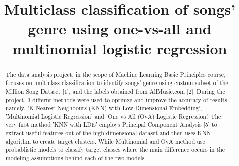 \documentclass[journal]{IEEEtran}
\begin{document}
%
\title{Multiclass classification of songs' genre using one-vs-all and multinomial logistic regression}

\maketitle


\begin{abstract}
The data analysis project, in the scope of Machine Learning Basic Principles course, focuses on multiclass classification to identify songs' genre using custom subset of the Million Song Dataset [1], and the labels obtained from AllMusic.com [2]. During the project, 3 differnt methods were used to optimze and improve the accuracy of results namely, 'K Nearest Neighbours (KNN) with Low Dimensional Embedding', 'Multinomial Logistic Regression' and 'One vs All (OvA) Logistic Regression'. The very first method 'KNN with LDE' employs Principal Component Analysis [5] to extract useful features out of the high-dimensional dataset and then uses KNN algorithm to create target clusters. While Multinomial and OvA method use probablistic models to classify target classes where the main difference occurs in the modeling assumptions behind each of the two models.


\end{abstract}







%
\IEEEpeerreviewmaketitle
\end{document}
